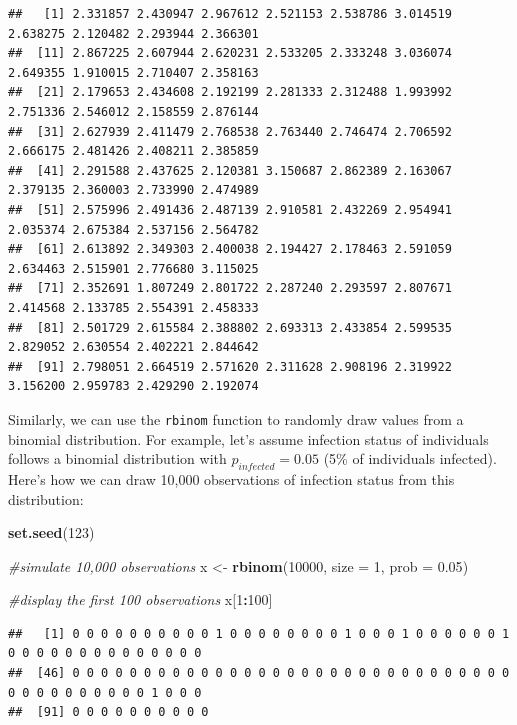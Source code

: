 \documentclass[
]{book}
\newenvironment{Shaded}{\begin{snugshade}}{\end{snugshade}}
\newcommand{\AttributeTok}[1]{\textcolor[rgb]{0.13,0.29,0.53}{#1}}
\newcommand{\CommentTok}[1]{\textcolor[rgb]{0.56,0.35,0.01}{\textit{#1}}}
\newcommand{\DecValTok}[1]{\textcolor[rgb]{0.00,0.00,0.81}{#1}}
\newcommand{\FloatTok}[1]{\textcolor[rgb]{0.00,0.00,0.81}{#1}}
\newcommand{\FunctionTok}[1]{\textcolor[rgb]{0.13,0.29,0.53}{\textbf{#1}}}
\newcommand{\NormalTok}[1]{#1}
\newcommand{\OtherTok}[1]{\textcolor[rgb]{0.56,0.35,0.01}{#1}}
\newcommand{\SpecialCharTok}[1]{\textcolor[rgb]{0.81,0.36,0.00}{\textbf{#1}}}
\begin{document}
\begin{verbatim}
##   [1] 2.331857 2.430947 2.967612 2.521153 2.538786 3.014519 2.638275 2.120482 2.293944 2.366301
##  [11] 2.867225 2.607944 2.620231 2.533205 2.333248 3.036074 2.649355 1.910015 2.710407 2.358163
##  [21] 2.179653 2.434608 2.192199 2.281333 2.312488 1.993992 2.751336 2.546012 2.158559 2.876144
##  [31] 2.627939 2.411479 2.768538 2.763440 2.746474 2.706592 2.666175 2.481426 2.408211 2.385859
##  [41] 2.291588 2.437625 2.120381 3.150687 2.862389 2.163067 2.379135 2.360003 2.733990 2.474989
##  [51] 2.575996 2.491436 2.487139 2.910581 2.432269 2.954941 2.035374 2.675384 2.537156 2.564782
##  [61] 2.613892 2.349303 2.400038 2.194427 2.178463 2.591059 2.634463 2.515901 2.776680 3.115025
##  [71] 2.352691 1.807249 2.801722 2.287240 2.293597 2.807671 2.414568 2.133785 2.554391 2.458333
##  [81] 2.501729 2.615584 2.388802 2.693313 2.433854 2.599535 2.829052 2.630554 2.402221 2.844642
##  [91] 2.798051 2.664519 2.571620 2.311628 2.908196 2.319922 3.156200 2.959783 2.429290 2.192074
\end{verbatim}

Similarly, we can use the \texttt{rbinom} function to randomly draw values from a binomial distribution. For example, let's assume infection status of individuals follows a binomial distribution with \(p_{infected} = 0.05\) (5\% of individuals infected). Here's how we can draw 10,000 observations of infection status from this distribution:

\begin{Shaded}
\begin{Highlighting}[]
\FunctionTok{set.seed}\NormalTok{(}\DecValTok{123}\NormalTok{)}

\CommentTok{\#simulate 10,000 observations}
\NormalTok{x }\OtherTok{\textless{}{-}} \FunctionTok{rbinom}\NormalTok{(}\DecValTok{10000}\NormalTok{, }\AttributeTok{size =} \DecValTok{1}\NormalTok{, }\AttributeTok{prob =} \FloatTok{0.05}\NormalTok{)}

\CommentTok{\#display the first 100 observations}
\NormalTok{x[}\DecValTok{1}\SpecialCharTok{:}\DecValTok{100}\NormalTok{]}
\end{Highlighting}
\end{Shaded}

\begin{verbatim}
##   [1] 0 0 0 0 0 0 0 0 0 0 1 0 0 0 0 0 0 0 0 1 0 0 0 1 0 0 0 0 0 0 1 0 0 0 0 0 0 0 0 0 0 0 0 0 0
##  [46] 0 0 0 0 0 0 0 0 0 0 0 0 0 0 0 0 0 0 0 0 0 0 0 0 0 0 0 0 0 0 0 0 0 0 0 0 0 0 0 0 0 1 0 0 0
##  [91] 0 0 0 0 0 0 0 0 0 0
\end{verbatim}
\end{document}
